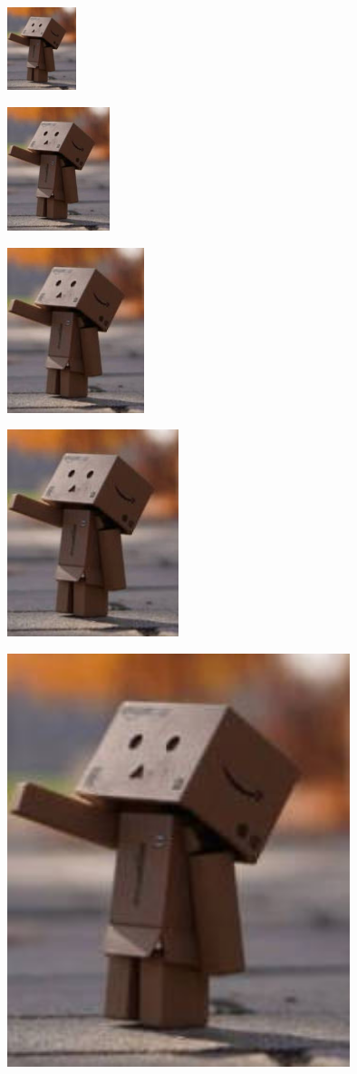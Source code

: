 \documentclass{article}
\begin{document}
	\includegraphics[width=2cm]{test.jpg}
	
	\includegraphics[width=3cm]{test.jpg}
	
	\includegraphics[width=4cm]{test.jpg}
	
	\includegraphics[width=5cm]{test.jpg}	
	
	\includegraphics[width=10cm]{test.jpg}
	
\end{document}
